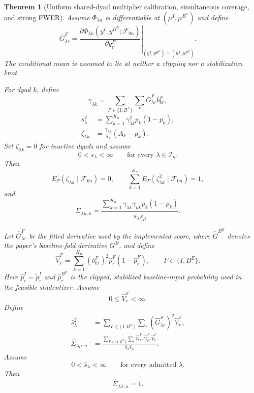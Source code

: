 \documentclass[11pt]{article}
\newtheorem{theorem}{Theorem}[section]
\theoremstyle{definition}
\newcommand{\1}{\mathbf 1}\newcommand{\op}{\operatorname}
\begin{document}
\begin{theorem}[Uniform shared-dyad multiplier calibration,\label{thm:fwer}
simultaneous coverage, and strong FWER]
Assume $\Phi_{\lambda n}$ is differentiable at
$(\mu^I,\mu^{B^E})$ and define
\begin{equation}
\overline G_{\lambda r}^F
=
\left.
\frac{
\partial\Phi_{\lambda n}
(y^I,y^{B^E};\mathcal F_{0n})
}{
\partial y_r^F
}
\right|_{(y^I,y^{B^E})=(\mu^I,\mu^{B^E})}.
\label{eq:oracle-derivative}
\end{equation}
The conditional mean is assumed to lie at neither a clipping nor a
stabilization knot.

For dyad $k$, define
\[
\gamma_{\lambda k}
=
\sum_{F\in\{I,B^E\}}\sum_r
\overline G_{\lambda r}^F b_{kr}^F,
\]
\begin{align}
s_\lambda^2
&=
\sum_{k=1}^{K_n}
\gamma_{\lambda k}^2p_k(1-p_k),
\label{eq:oracle-standard-error}\\
\zeta_{\lambda k}
&=
\frac{\gamma_{\lambda k}}{s_\lambda}(A_k-p_k).
\label{eq:oracle-influence-variable}
\end{align}
Set $\zeta_{\lambda k}=0$ for inactive dyads and assume
\[
0<s_\lambda<\infty
\qquad
\text{for every }\lambda\in\mathcal I_n.
\]
Then
\[
E_P(\zeta_{\lambda k}\mid\mathcal F_{0n})=0,
\qquad
\sum_{k=1}^{K_n}
E_P(\zeta_{\lambda k}^2\mid\mathcal F_{0n})=1,
\]
and
\begin{equation}
\Sigma_{\lambda\mu,n}
=
\frac{
\sum_{k=1}^{K_n}
\gamma_{\lambda k}\gamma_{\mu k}p_k(1-p_k)
}{
s_\lambda s_\mu
}.
\label{eq:oracle-correlation}
\end{equation}

Let $\widehat G_{\lambda r}^F$ be the fitted derivative used by the
implemented score, where $\widehat G^{B^E}$ denotes the paper's
baseline-fold derivative $G^B$, and define
\begin{equation}
\widehat V_r^F
=
\sum_{k=1}^{K_n}
(b_{kr}^F)^2
\widehat p_r^F(1-\widehat p_r^F),
\qquad
F\in\{I,B^E\}.
\label{eq:fitted-meat}
\end{equation}
Here $\widehat p_r^I=\widetilde p_r^I$ and
$\widehat p_r^{B^E}$ is the clipped, stabilized baseline-input
probability used in the feasible studentizer. Assume
\[
0\le\widehat V_r^F<\infty.
\]
Define
\begin{align}
\widehat s_\lambda^2
&=
\sum_{F\in\{I,B^E\}}\sum_r
(\widehat G_{\lambda r}^F)^2\widehat V_r^F,
\label{eq:feasible-standard-error}\\
\widehat\Sigma_{\lambda\mu,n}
&=
\frac{
\sum_{F\in\{I,B^E\}}\sum_r
\widehat G_{\lambda r}^F
\widehat G_{\mu r}^F
\widehat V_r^F
}{
\widehat s_\lambda\widehat s_\mu
}.
\label{eq:feasible-correlation}
\end{align}
Assume
\[
0<\widehat s_\lambda<\infty
\qquad
\text{for every admitted }\lambda.
\]
Then
\[
\widehat\Sigma_{\lambda\lambda,n}=1.
\]


\end{theorem}
\end{document}
